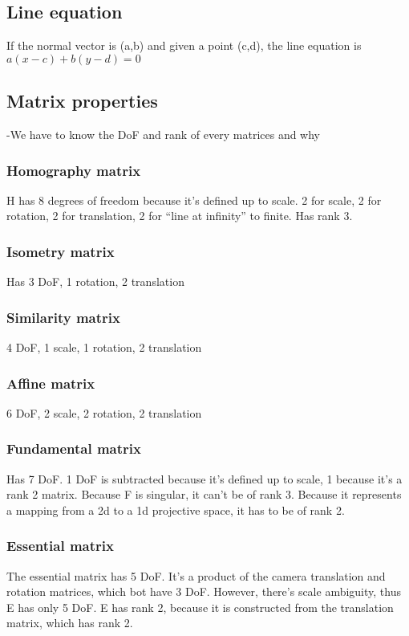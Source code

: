 \subsection{Line equation}

If the normal vector is (a,b) and given a point (c,d), the line equation is
\(a(x-c) + b(y-d)=0\)


\subsection{Matrix properties}

-We have to know the DoF and rank of every matrices and why

\subsubsection{Homography matrix}
H has 8 degrees of freedom because it's defined up to scale.
2 for scale, 2 for rotation, 2 for translation, 2 for ``line at infinity'' to
finite. Has rank 3.

\subsubsection{Isometry matrix}
Has 3 DoF, 1 rotation, 2 translation

\subsubsection{Similarity matrix}
4 DoF, 1 scale, 1 rotation, 2 translation

\subsubsection{Affine matrix}
6 DoF, 2 scale, 2 rotation, 2 translation

\subsubsection{Fundamental matrix}
Has 7 DoF. 1 DoF is subtracted because it's defined up to scale, 1 because it's
a rank 2 matrix. Because F is singular, it can't be of rank 3. Because it
represents a mapping from a 2d to a 1d projective space, it has to be of rank
2.

\subsubsection{Essential matrix}
The essential matrix has 5 DoF. It's a product of the camera translation and
rotation matrices, which bot have 3 DoF. However, there's scale ambiguity, thus
E has only 5 DoF. E has rank 2, because it is constructed from the translation
matrix, which has rank 2.

